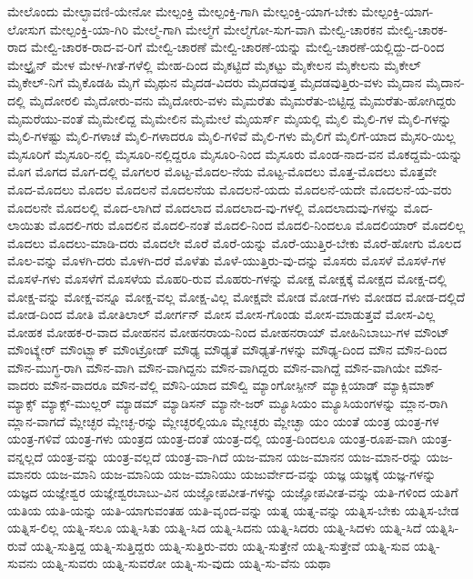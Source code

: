 {ಮೇಲೊಂದು
ಮೇಲ್ಛಾವಣಿ-ಯೇನೋ
ಮೇಲ್ಪಂಕ್ತಿ
ಮೇಲ್ಪಂಕ್ತಿ-ಗಾಗಿ
ಮೇಲ್ಪಂಕ್ತಿ-ಯಾಗ-ಬೇಕು
ಮೇಲ್ಪಂಕ್ತಿ-ಯಾಗ-ಲೋಸುಗ
ಮೇಲ್ಪಂಕ್ತಿ-ಯಾ-ಗಿರಿ
ಮೇಲ್ಮೆ-ಗಾಗಿ
ಮೇಲ್ಮೆಗೆ
ಮೇಲ್ಮೆಗೋ-ಸುಗ-ವಾಗಿ
ಮೇಲ್ವಿ-ಚಾರಕನ
ಮೇಲ್ವಿ-ಚಾರಕ-ರಾದ
ಮೇಲ್ವಿ-ಚಾರಕ-ರಾದ-ವ-ರಿಗೆ
ಮೇಲ್ವಿ-ಚಾರಣೆ
ಮೇಲ್ವಿ-ಚಾರಣೆ-ಯನ್ನು
ಮೇಲ್ವಿ-ಚಾರಣೆ-ಯಲ್ಲಿದ್ದು-ದ-ರಿಂದ
ಮೇಲ್ಟ್ರೈನ್
ಮೇಳ
ಮೇಳ-ಗೀತೆ-ಗಳೆಲ್ಲಿ
ಮೇಹ-ದಿಂದ
ಮೈಕಟ್ಟಿದೆ
ಮೈಕಟ್ಟು
ಮೈಕೇಲನ
ಮೈಕೇಲನು
ಮೈಕೇಲ್
ಮೈಕೇಲ್-ನಿಗೆ
ಮೈಕೊಡಹಿ
ಮೈಗೆ
ಮೈಥುನ
ಮೈದಡ-ವಿದರು
ಮೈದಡವುತ್ತ
ಮೈದಡವುತ್ತಿರು-ವಳು
ಮೈದಾನ
ಮೈದಾನ-ದಲ್ಲಿ
ಮೈದೋರಲಿ
ಮೈದೋರು-ವನು
ಮೈದೋರು-ವಳು
ಮೈಮರೆತು
ಮೈಮರೆತು-ಬಿಟ್ಟಿದ್ದ
ಮೈಮರೆತು-ಹೋಗಿದ್ದರು
ಮೈಮರೆಯು-ವಂತೆ
ಮೈಮೇಲಿದ್ದ
ಮೈಮೇಲಿನ
ಮೈಮೇಲೆ
ಮೈಯರ್ಸ್
ಮೈಯಲ್ಲಿ
ಮೈಲಿ
ಮೈಲಿ-ಗಳ
ಮೈಲಿ-ಗಳನ್ನು
ಮೈಲಿ-ಗಳಷ್ಟು
ಮೈಲಿ-ಗಳಾಚೆ
ಮೈಲಿ-ಗಳಾದರೂ
ಮೈಲಿ-ಗಳಿವೆ
ಮೈಲಿ-ಗಳು
ಮೈಲಿಗೆ
ಮೈಲಿಗೆ-ಯಾದ
ಮೈಸರಿ-ಯಿಲ್ಲ
ಮೈಸೂರಿಗೆ
ಮೈಸೂರಿ-ನಲ್ಲಿ
ಮೈಸೂರಿ-ನಲ್ಲಿದ್ದರೂ
ಮೈಸೂರಿ-ನಿಂದ
ಮೈಸೂರು
ಮೊಂಡ-ನಾದ-ವನ
ಮೊಕದ್ದಮೆ-ಯನ್ನು
ಮೊಗ
ಮೊಗದ
ಮೊಗ-ದಲ್ಲಿ
ಮೊಗಲರ
ಮೊಟ್ಟ-ಮೊದಲ-ನೆಯ
ಮೊಟ್ಟ-ಮೊದಲು
ಮೊತ್ತ-ಮೊದಲು
ಮೊತ್ತವೇ
ಮೊದ-ಮೊದಲು
ಮೊದಲ
ಮೊದಲನೆ
ಮೊದಲನೆಯ
ಮೊದಲನೆ-ಯದು
ಮೊದಲನೆ-ಯದೇ
ಮೊದಲನೆ-ಯ-ವರು
ಮೊದಲನೇ
ಮೊದಲಲ್ಲಿ
ಮೊದ-ಲಾಗಿದೆ
ಮೊದಲಾದ
ಮೊದಲಾದ-ವು-ಗಳಲ್ಲಿ
ಮೊದಲಾದುವು-ಗಳನ್ನು
ಮೊದ-ಲಾಯಿತು
ಮೊದಲಿ-ಗರು
ಮೊದಲಿನ
ಮೊದಲಿ-ನಂತೆ
ಮೊದಲಿ-ನಿಂದ
ಮೊದಲಿ-ನಿಂದಲೂ
ಮೊದಲಿಯಾರ್
ಮೊದಲಿಲ್ಲ
ಮೊದಲು
ಮೊದಲು-ಮಾಡಿ-ದರು
ಮೊದಲೇ
ಮೊರೆ
ಮೊರೆ-ಯನ್ನು
ಮೊರೆ-ಯುತ್ತಿರ-ಬೇಕು
ಮೊರೆ-ಹೋಗು
ಮೊಲದ
ಮೊಲ-ವನ್ನು
ಮೊಳಗಿ-ದರು
ಮೊಳಗಿ-ದರೆ
ಮೊಳೆತು
ಮೊಳೆ-ಯುತ್ತಿರು-ವು-ದನ್ನು
ಮೊಸರು
ಮೊಸಳೆ
ಮೊಸಳೆ-ಗಳ
ಮೊಸಳೆ-ಗಳು
ಮೊಸಳೆಗೆ
ಮೊಸಳೆಯ
ಮೊಹರಿ-ರುವ
ಮೊಹರು-ಗಳನ್ನು
ಮೋಕ್ಷ
ಮೋಕ್ಷಕ್ಕೆ
ಮೋಕ್ಷದ
ಮೋಕ್ಷ-ದಲ್ಲಿ
ಮೋಕ್ಷ-ವನ್ನು
ಮೋಕ್ಷ-ವನ್ನೂ
ಮೋಕ್ಷ-ವಲ್ಲ
ಮೋಕ್ಷ-ವಿಲ್ಲ
ಮೋಕ್ಷವೇ
ಮೋಡ
ಮೋಡ-ಗಳು
ಮೋಡದ
ಮೋಡ-ದಲ್ಲಿದೆ
ಮೋಡ-ದಿಂದ
ಮೋತಿ
ಮೋತಿಲಾಲ್
ಮೋರ್ಗನ್
ಮೋಸ
ಮೋಸ-ಗೊಂಡು
ಮೋಸ-ಮಾಡುತ್ತವೆ
ಮೋಸ-ವಿಲ್ಲ
ಮೋಹಕ
ಮೋಹಕ-ರ-ವಾದ
ಮೋಹನನ
ಮೋಹನರಾಯ-ನಿಂದ
ಮೋಹನರಾಯ್
ಮೋಹಿನಿಬಾಬು-ಗಳ
ಮೌಂಟ್
ಮೌಂಟ್ಕ್ಲೇರ್
ಮೌಂಟ್ಬ್ಲಾಕ್
ಮೌಂಟ್ರೋಡ್
ಮೌಢ್ಯ
ಮೌಢ್ಯತೆ
ಮೌಢ್ಯತೆ-ಗಳನ್ನು
ಮೌಢ್ಯ-ದಿಂದ
ಮೌನ
ಮೌನ-ದಿಂದ
ಮೌನ-ಮುಗ್ಧ-ರಾಗಿ
ಮೌನ-ವಾಗಿ
ಮೌನ-ವಾಗಿದ್ದನು
ಮೌನ-ವಾಗಿದ್ದರು
ಮೌನ-ವಾಗಿದ್ದೆ
ಮೌನ-ವಾಗಿಯೇ
ಮೌನ-ವಾದರು
ಮೌನ-ವಾದರೂ
ಮೌನ-ವೆಲ್ಲಿ
ಮೌನಿ-ಯಾದ
ಮೌಲ್ವಿ
ಮ್ಯಾಂಗೋಸ್ಪೀನ್
ಮ್ಯಾಕ್ಲಿಯಾಡ್
ಮ್ಯಾಕ್ಸಿಮಾಕ್
ಮ್ಯಾಕ್ಸ್
ಮ್ಯಾಕ್ಸ್-ಮುಲ್ಲರ್
ಮ್ಯಾಡಮ್
ಮ್ಯಾಡಿಸನ್
ಮ್ಯಾನೇ-ಜರ್
ಮ್ಯೂಸಿಯಂ
ಮ್ಯೂಸಿಯಂಗಳನ್ನು
ಮ್ಲಾನ-ರಾಗಿ
ಮ್ಲಾನ-ವಾಗದೆ
ಮ್ಲೇಚ್ಛರ
ಮ್ಲೇಚ್ಛ-ರನ್ನು
ಮ್ಲೇಚ್ಛರಲ್ಲಿಯೂ
ಮ್ಲೇಚ್ಛರು
ಮ್ಲೇಚ್ಛಾ
ಯಂ
ಯಂತೆ
ಯಂತ್ರ
ಯಂತ್ರ-ಗಳ
ಯಂತ್ರ-ಗಳಿವೆ
ಯಂತ್ರ-ಗಳು
ಯಂತ್ರದ
ಯಂತ್ರ-ದಂತೆ
ಯಂತ್ರ-ದಲ್ಲಿ
ಯಂತ್ರ-ದಿಂದಲೂ
ಯಂತ್ರ-ರೂಪ-ವಾಗಿ
ಯಂತ್ರ-ವನ್ನಲ್ಲದೆ
ಯಂತ್ರ-ವನ್ನು
ಯಂತ್ರ-ವಲ್ಲದೆ
ಯಂತ್ರ-ವಾ-ಗಿದೆ
ಯಜ-ಮಾನ
ಯಜ-ಮಾನನ
ಯಜ-ಮಾನ-ರನ್ನು
ಯಜ-ಮಾನರು
ಯಜ-ಮಾನಿ
ಯಜ-ಮಾನಿಯ
ಯಜ-ಮಾನಿಯು
ಯಜುರ್ವೇದ-ವನ್ನು
ಯಜ್ಞ
ಯಜ್ಞಕ್ಕೆ
ಯಜ್ಞ-ಗಳನ್ನು
ಯಜ್ಞದ
ಯಜ್ಞೇಶ್ವರ
ಯಜ್ಞೇಶ್ವರಬಾಬು-ವಿನ
ಯಜ್ಞೋಪವೀತ-ಗಳನ್ನು
ಯಜ್ಞೋಪವೀತ-ವನ್ನು
ಯತಿ-ಗಳಿಂದ
ಯತಿಗೆ
ಯತಿಯ
ಯತಿ-ಯನ್ನು
ಯತಿ-ಯಾಗುವಂತಹ
ಯತಿ-ವೃಂದ-ವನ್ನು
ಯತ್ನ
ಯತ್ನ-ವನ್ನು
ಯತ್ನಿಸ-ಬೇಕು
ಯತ್ನಿಸ-ಬೇಡ
ಯತ್ನಿಸ-ಲಿಲ್ಲ
ಯತ್ನಿ-ಸಲೂ
ಯತ್ನಿ-ಸಿತು
ಯತ್ನಿ-ಸಿದ
ಯತ್ನಿ-ಸಿದನು
ಯತ್ನಿ-ಸಿದರು
ಯತ್ನಿ-ಸಿದಳು
ಯತ್ನಿ-ಸಿದೆ
ಯತ್ನಿಸಿ-ರುವೆ
ಯತ್ನಿ-ಸುತ್ತಿದ್ದ
ಯತ್ನಿ-ಸುತ್ತಿದ್ದರು
ಯತ್ನಿ-ಸುತ್ತಿರು-ವರು
ಯತ್ನಿ-ಸುತ್ತೇನೆ
ಯತ್ನಿ-ಸುತ್ತೇವೆ
ಯತ್ನಿ-ಸುವ
ಯತ್ನಿ-ಸುವನು
ಯತ್ನಿ-ಸುವರು
ಯತ್ನಿ-ಸುವರೋ
ಯತ್ನಿ-ಸು-ವುದು
ಯತ್ನಿ-ಸು-ವೆನು
ಯಥಾ
}
